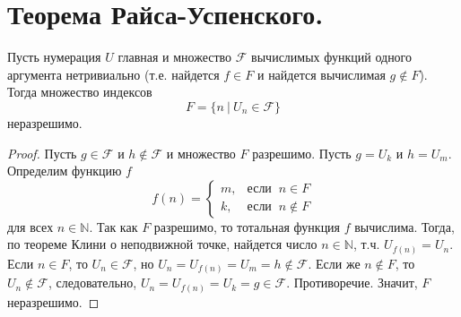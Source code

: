 \section{Теорема Райса-Успенского.}

\begin{theorem}
  Пусть нумерация $U$ главная и множество $\mathcal{F}$ вычислимых функций одного аргумента нетривиально (т.е. найдется $f \in F$ и найдется вычислимая $g \notin F$). Тогда множество индексов
  \[
    F = \{n \> | \> U_n \in \mathcal{F}\}
  \]
  неразрешимо.
  \begin{proof}
    Пусть $g \in \mathcal{F}$ и $h \notin \mathcal{F}$ и множество $F$ разрешимо. Пусть $g = U_k$ и $h = U_m$. Определим функцию $f$
    \[
      f(n) = \begin{cases}
        m, & \textit{если } \> n \in F \\
        k, & \textit{если } \> n \notin F
      \end{cases}
    \]
    для всех $n \in \mathbb{N}$. Так как $F$ разрешимо, то тотальная функция $f$ вычислима. Тогда, по теореме Клини о неподвижной точке, найдется число $n \in \mathbb{N}$, т.ч. $U_{f(n)} = U_n$. Если $n \in F$, то $U_n \in \mathcal{F}$, но $U_n = U_{f(n)} = U_m = h \notin \mathcal{F}$. Если же $n \notin F$, то $U_n \notin \mathcal{F}$, следовательно, $U_n = U_{f(n)} = U_k = g \in \mathcal{F}$. Противоречие. Значит, $F$ неразрешимо.
  \end{proof}
\end{theorem}